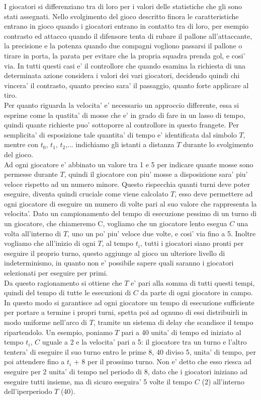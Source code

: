 I giocatori si differenziano tra di loro per i valori delle statistiche che gli sono stati assegnati. Nello svolgimento del gioco descritto finora le caratteristiche entrano in gioco quando i giocatori entrano in contatto tra di loro, per esempio contrasto ed attacco quando il difensore tenta di rubare il pallone all'attaccante, la precisione e la potenza quando due compagni vogliono passarsi il pallone o tirare in porta, la parata per evitare che la propria squadra prenda gol, e cosi' via. In tutti questi casi e' il controllore che quando esamina la richiesta di una determinata azione considera i valori dei vari giocatori, decidendo quindi chi vincera' il contrasto, quanto preciso sara' il passaggio, quanto forte applicare al tiro.\\

Per quanto riguarda la velocita' e' necessario un approccio differente, essa si esprime come la quatita' di mosse che e' in grado di fare in un lasso di tempo, quindi quante richieste puo' sottoporre al controllore in questo frangete. Per semplicita' di esposizione tale quantita' di tempo e' identificata dal simbolo $T$, mentre con $t_0$, $t_1$, $t_2$,... indichiamo gli istanti a distanza $T$ durante lo svolgimento del gioco.\\

Ad ogni giocatore e' abbinato un valore tra 1 e 5 per indicare quante mosse sono permesse durante $T$, quindi il giocatore con piu' mosse a disposizione sara' piu' veloce rispetto ad un numero minore. Questo rispecchia quanti turni deve poter eseguire, diventa quindi cruciale come viene calcolato $T$, esso deve permettere ad ogni giocatore di eseguire un numero di volte pari al suo valore che rappresenta la velocita'. Dato un campionamento del tempo di esecuzione pessimo di un turno di un giocatore, che chiameremo C, vogliamo che un giocatore lento esegua $C$ una volta all'interno di $T$, uno un po' piu' veloce due volte, e cosi' via fino a 5. Inoltre vogliamo che all'inizio di ogni $T$, al tempo $t_i$, tutti i giocatori siano pronti per eseguire il proprio turno, questo aggiunge al gioco un ulteriore livello di indeterminismo, in quanto non e' possibile sapere quali saranno i giocatori selezionati per eseguire per primi.\\

Da questo ragionamento si ottiene che $T$ e' pari alla somma di tutti questi tempi, quindi del tempo di tutte le esecuzioni di $C$ da parte di ogni giocatore in campo. In questo modo si garantisce ad ogni giocatore un tempo di esecuzione sufficiente per portare a termine i propri turni, spetta poi ad ognuno di essi distribuirli in modo uniforme nell'arco di $T$, tramite un sistema di delay che scandisce il tempo ripartendolo. Un esempio, poniamo $T$ pari a 40 unita' di tempo ed iniziato al tempo $t_i$, $C$ uguale a 2 e la velocita' pari a 5: il giocatore tra un turno e l'altro tentera' di eseguire il suo turno entro le prime 8, 40 diviso 5, unita' di tempo, per poi attendere fino a $t_i$ + 8 per il prossimo turno. Non e' detto che esso riesca ad eseguire per 2 unita' di tempo nel periodo di 8, dato che i giocatori iniziano ad eseguire tutti insieme, ma di sicuro eseguira' 5 volte il tempo $C$ (2) all'interno dell'iperperiodo $T$ (40).\\

